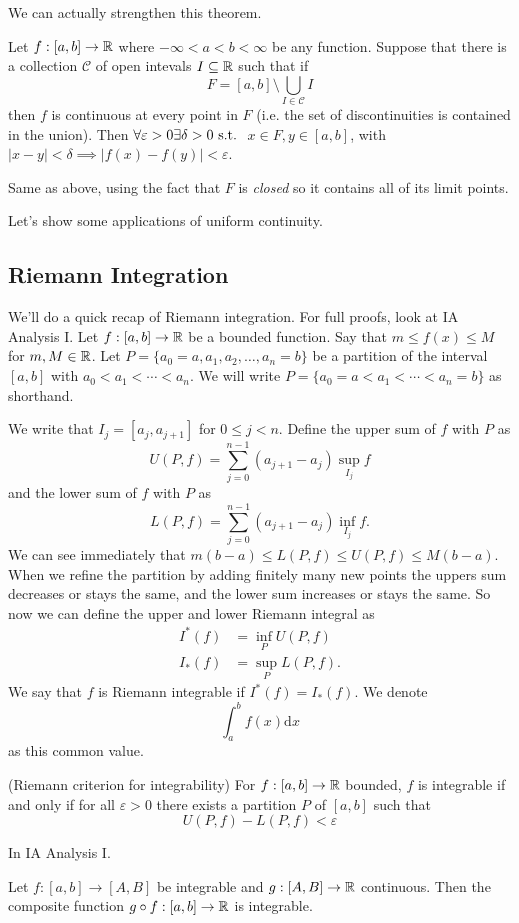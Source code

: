 \documentclass{article}
\newcommand{\eps}{\varepsilon}
\begin{document}
We can actually strengthen this theorem.
\begin{theorem}
	Let $ f:[a,b]\to \mathbb{R} $ where $ -\infty<a<b<\infty $ be any function. Suppose that there is a collection $ \mathcal C $ of open intevals $ I\subseteq \mathbb{R} $ such that if
	\[
		F=[a,b]\setminus\bigcup_{I\in\mathcal C}I
	\]
	then $ f $ is continuous at every point in $ F $ (i.e. the set of discontinuities is contained in the union). Then $ \forall \eps>0 \exists\delta>0\st $ $ x\in F,y\in [a,b] $, with $ |x-y|<\delta \implies |f(x)-f(y)|<\eps $.
\end{theorem}
\pf Same as above, using the fact that $ F $ is \textit{closed} so it contains all of its limit points.\par
Let's show some applications of uniform continuity.
\subsection{Riemann Integration}
We'll do a quick recap of Riemann integration. For full proofs, look at IA Analysis I. Let $ f: [a,b]\to \mathbb{R} $ be a bounded function. Say that $ m\le f(x)\le M $ for $ m,M\in \mathbb{R} $. Let $ P =\{a_0=a, a_1,a_2,\dots, a_n=b\} $ be a partition of the interval $ [a,b] $ with $ a_0<a_1<\cdots<a_n $. We will write $ P=\{a_0=a<a_1<\cdots<a_n=b \} $ as shorthand.\par
We write that $ I_j=[a_j,a_{j+1}] $ for $ 0\le j<n $. Define the upper sum of $ f $ with $ P $ as
\[
	U(P,f)=\sum_{j=0}^{n-1}(a_{j+1}-a_j)\sup_{I_j}f
\]
and the lower sum of $ f $ with $ P $ as
\[
	L(P,f)=\sum_{j=0}^{n-1}(a_{j+1}-a_j)\inf_{I_j}f.
\]
We can see immediately that $ m(b-a) \le L(P,f)\le U(P,f)\le M(b-a) $. When we refine the partition by adding finitely many new points the uppers sum decreases or stays the same, and the lower sum increases or stays the same. So now we can define the upper and lower Riemann integral as
\begin{align*}
	I^*(f)&=\inf_PU(P,f)\\
	I_*(f)&=\sup_PL(P,f).
\end{align*}
We say that $ f $ is Riemann integrable if $ I^*(f)=I_*(f) $. We denote
\[
  \int_a^bf(x)\mathrm dx
\]
as this common value.
\begin{theorem}
	(Riemann criterion for integrability) For $ f:[a,b]\to \mathbb{R} $ bounded, $ f $ is integrable if and only if for all $ \eps>0 $ there exists a partition $ P $ of $ [a,b] $ such that
	\[
	  U(P,f)-L(P,f)<\eps
	\]
\end{theorem}
\pf In IA Analysis I.
\begin{theorem}
	Let $ f:[a,b]\to[A,B] $ be integrable and $ g:[A,B]\to\mathbb{R} $ continuous. Then the composite function $ g\circ f:[a,b]\to\mathbb{R} $ is integrable.
\end{theorem}
\end{document}
